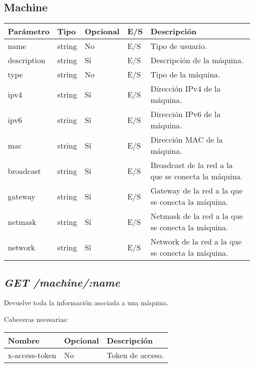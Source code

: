 \subsection{Machine}
\begin{table}[!h]
	\centering
	\begin{adjustbox}{max width=\textwidth}
	\begin{tabular}{|l|l|l|l|l|}
		\hline
		Parámetro & Tipo & Opcional & E/S & Descripción \\ \hline
		name & string & No & E/S & Tipo de usuario. \\ \hline
		description & string & Sí & E/S & Descripción de la máquina. \\ \hline
		type & string & No & E/S & Tipo de la máquina. \\ \hline
		ipv4 & string & Sí & E/S & Dirección IPv4 de la máquina. \\ \hline
		ipv6 & string & Sí & E/S & Dirección IPv6 de la máquina. \\ \hline
		mac & string & Sí & E/S & Dirección MAC de la máquina. \\ \hline
		broadcast & string & Sí & E/S & Broadcast de la red a la que se conecta la máquina. \\ \hline
		gateway & string & Sí & E/S & Gateway de la red a la que se conecta la máquina. \\ \hline
		netmask & string & Sí & E/S & Netmask de la red a la que se conecta la máquina. \\ \hline
		network & string & Sí & E/S & Network de la red a la que se conecta la máquina. \\ \hline
	\end{tabular}
\end{adjustbox}
\end{table}


\subsection{\textit{GET /machine/:name}}
Devuelve toda la información asociada a una máquina.

Cabeceras necesarias:
\begin{table}[h!]
	\centering
	\begin{adjustbox}{max width=\textwidth}
	\begin{tabular}{|l|l|l|}
		\hline
		Nombre & Opcional & Descripción \\ \hline
		x-access-token & No & Token de acceso. \\ \hline
	\end{tabular}
\end{adjustbox}
\end{table}


